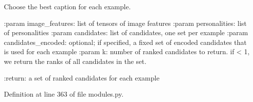 \begin{DoxyVerb}Choose the best caption for each example.

:param image_features:
    list of tensors of image features
:param personalities:
    list of personalities
:param candidates:
    list of candidates, one set per example
:param candidates_encoded:
    optional; if specified, a fixed set of encoded candidates that is
    used for each example
:param k:
    number of ranked candidates to return. if < 1, we return the ranks
    of all candidates in the set.

:return:
    a set of ranked candidates for each example
\end{DoxyVerb}
 

Definition at line 363 of file modules.\+py.



